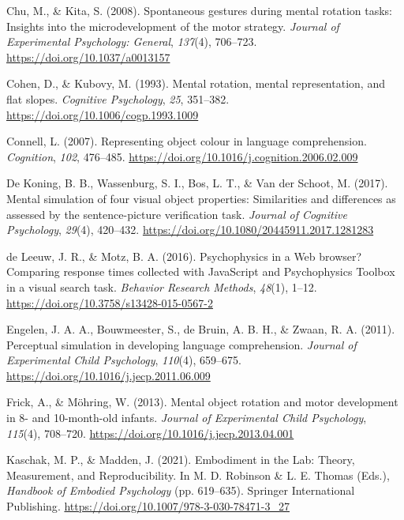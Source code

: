 \documentclass[
  man]{apa7}
\newlength{\cslhangindent}
\newlength{\cslentryspacingunit} %
\newenvironment{CSLReferences}[2] %
 {%
  \setlength{\parindent}{0pt}
  \ifodd #1
  \let\oldpar\par
  \def\par{\hangindent=\cslhangindent\oldpar}
  \fi
  \setlength{\parskip}{#2\cslentryspacingunit}
 }%
 {}
\begin{document}
\begin{CSLReferences}{1}{0}
\leavevmode{}%
Chu, M., \& Kita, S. (2008). Spontaneous gestures during mental rotation tasks: {Insights} into the microdevelopment of the motor strategy. \emph{Journal of Experimental Psychology: General}, \emph{137}(4), 706--723. \url{https://doi.org/10.1037/a0013157}

\leavevmode{}%
Cohen, D., \& Kubovy, M. (1993). Mental rotation, mental representation, and flat slopes. \emph{Cognitive Psychology}, \emph{25}, 351--382. \url{https://doi.org/10.1006/cogp.1993.1009}

\leavevmode{}%
Connell, L. (2007). Representing object colour in language comprehension. \emph{Cognition}, \emph{102}, 476--485. \url{https://doi.org/10.1016/j.cognition.2006.02.009}

\leavevmode{}%
De Koning, B. B., Wassenburg, S. I., Bos, L. T., \& Van der Schoot, M. (2017). Mental simulation of four visual object properties: Similarities and differences as assessed by the sentence-picture verification task. \emph{Journal of Cognitive Psychology}, \emph{29}(4), 420--432. \url{https://doi.org/10.1080/20445911.2017.1281283}

\leavevmode{}%
de Leeuw, J. R., \& Motz, B. A. (2016). Psychophysics in a {Web} browser? {Comparing} response times collected with {JavaScript} and {Psychophysics Toolbox} in a visual search task. \emph{Behavior Research Methods}, \emph{48}(1), 1--12. \url{https://doi.org/10.3758/s13428-015-0567-2}

\leavevmode{}%
Engelen, J. A. A., Bouwmeester, S., de Bruin, A. B. H., \& Zwaan, R. A. (2011). Perceptual simulation in developing language comprehension. \emph{Journal of Experimental Child Psychology}, \emph{110}(4), 659--675. \url{https://doi.org/10.1016/j.jecp.2011.06.009}

\leavevmode{}%
Frick, A., \& Möhring, W. (2013). Mental object rotation and motor development in 8- and 10-month-old infants. \emph{Journal of Experimental Child Psychology}, \emph{115}(4), 708--720. \url{https://doi.org/10.1016/j.jecp.2013.04.001}

\leavevmode{}%
Kaschak, M. P., \& Madden, J. (2021). Embodiment in the {Lab}: {Theory}, {Measurement}, and {Reproducibility}. In M. D. Robinson \& L. E. Thomas (Eds.), \emph{Handbook of {Embodied Psychology}} (pp. 619--635). {Springer International Publishing}. \url{https://doi.org/10.1007/978-3-030-78471-3_27}


\end{CSLReferences}
\end{document}
